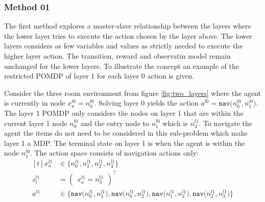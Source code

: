 \subsubsection{Method 01}\label{subsec:M1}
The first method explores a master-slave relationship between the layers where the lower layer tries to execute the action chosen by the layer above. The lower layers considers as few variables and values as strictly needed to execute the higher layer action. The transition, reward and observatin model remain unchanged for the lower layers. To illustrate the concept an example of the restricted POMDP of layer 1 for each layer 0 action is given.
\begin{example}\label{ex:M1_nav}
Consider the three room environment from figure \ref{fig:two_layers} where the agent is currently in node $x_a^{l0}=n_0^{l0}$. Solving layer 0 yields the action $a^{l0}=\texttt{nav($n_0^{l0},n_1^{l0}$)}$. The layer 1 POMDP only considers the nodes on layer 1 that are within the current layer 1 node $n_0^{l0}$ and the entry node to $n_1^{l0}$ which is $n_3^{l1}$. To navigate the agent the items do not need to be considered in this sub-problem which make layer 1 a MDP. The terminal state on layer 1 is when the agent is within the node $n_1^{l0}$. The action space consists of navigation actions only:
\begin{equation}
     \begin{aligned}[t] 
        x_a^{l1} &\in \big\{n_0^{l1}, n_1^{l1}, n_2^{l1}, n_3^{l1}  \big\} \\
        s_t^{l1} &= \begin{pmatrix}x_a^{l1}=n_3^{l1} \end{pmatrix}^\intercal\\
        a^{l1} &\in \big\{\texttt{nav($n_0^{l1}, n_1^{l1}$)}, \texttt{nav($n_0^{l1}, n_2^{l1}$)}, \texttt{nav($n_1^{l1}, n_2^{l1}$)},\texttt{nav($n_2^{l1}, n_3^{l1}$)} \big\}
    \end{aligned}
\end{equation}
\demo
\end{example}

